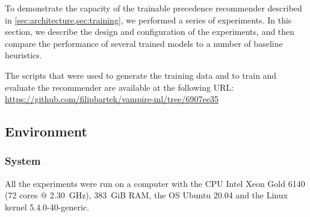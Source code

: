


To demonstrate the capacity of the trainable precedence recommender described in \cref{sec:architecture,sec:training},
we performed a series of experiments.
In this section, we describe the design and configuration of the experiments,
and then compare the performance of several trained models to a number of baseline heuristics.

The scripts that were used to generate the training data and to train and evaluate the recommender
are available at the following URL:
\url{https://github.com/filipbartek/vampire-ml/tree/6907ee35}

\subsection{Environment}

\subsubsection{System}

All the experiments were run on a computer with
the CPU Intel Xeon Gold 6140 (72 cores @ \SI{2.30}{GHz}),
\SI{383}{GiB} RAM,
the OS Ubuntu 20.04 and
the Linux kernel 5.4.0-40-generic.


